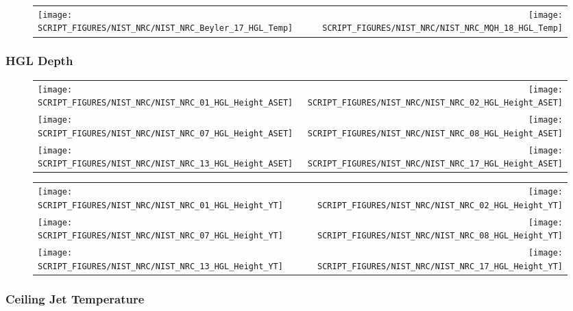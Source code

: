 \begin{figure}[!ht]
\begin{tabular*}{\textwidth}{l@{\extracolsep{\fill}}r}
\texttt{[image: SCRIPT\_FIGURES/NIST\_NRC/NIST\_NRC\_Beyler\_17\_HGL\_Temp]} &
\texttt{[image: SCRIPT\_FIGURES/NIST\_NRC/NIST\_NRC\_MQH\_18\_HGL\_Temp]}
\end{tabular*}
\end{figure}

\clearpage

\subsubsection{HGL Depth}

\begin{figure}[!ht]
\begin{tabular*}{\textwidth}{l@{\extracolsep{\fill}}r}
\texttt{[image: SCRIPT\_FIGURES/NIST\_NRC/NIST\_NRC\_01\_HGL\_Height\_ASET]} &
\texttt{[image: SCRIPT\_FIGURES/NIST\_NRC/NIST\_NRC\_02\_HGL\_Height\_ASET]} \\
\texttt{[image: SCRIPT\_FIGURES/NIST\_NRC/NIST\_NRC\_07\_HGL\_Height\_ASET]} &
\texttt{[image: SCRIPT\_FIGURES/NIST\_NRC/NIST\_NRC\_08\_HGL\_Height\_ASET]} \\
\texttt{[image: SCRIPT\_FIGURES/NIST\_NRC/NIST\_NRC\_13\_HGL\_Height\_ASET]} &
\texttt{[image: SCRIPT\_FIGURES/NIST\_NRC/NIST\_NRC\_17\_HGL\_Height\_ASET]}
\end{tabular*}
\end{figure}

\begin{figure}[!ht]
\begin{tabular*}{\textwidth}{l@{\extracolsep{\fill}}r}
\texttt{[image: SCRIPT\_FIGURES/NIST\_NRC/NIST\_NRC\_01\_HGL\_Height\_YT]} &
\texttt{[image: SCRIPT\_FIGURES/NIST\_NRC/NIST\_NRC\_02\_HGL\_Height\_YT]} \\
\texttt{[image: SCRIPT\_FIGURES/NIST\_NRC/NIST\_NRC\_07\_HGL\_Height\_YT]} &
\texttt{[image: SCRIPT\_FIGURES/NIST\_NRC/NIST\_NRC\_08\_HGL\_Height\_YT]} \\
\texttt{[image: SCRIPT\_FIGURES/NIST\_NRC/NIST\_NRC\_13\_HGL\_Height\_YT]} &
\texttt{[image: SCRIPT\_FIGURES/NIST\_NRC/NIST\_NRC\_17\_HGL\_Height\_YT]}
\end{tabular*}
\end{figure}

\clearpage

\subsubsection{Ceiling Jet Temperature}

